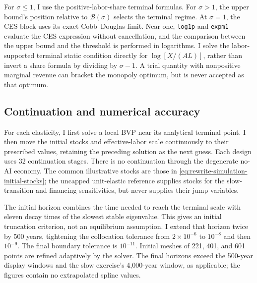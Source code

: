 For $\sigma\leq1$, I use the positive-labor-share terminal formulas.
For $\sigma>1$, the upper bound's position relative to $\mathcal B(\sigma)$ selects
the terminal regime. At $\sigma=1$, the CES block uses its exact
Cobb--Douglas limit. Near one, \texttt{log1p} and \texttt{expm1} evaluate
the CES expression without cancellation, and the comparison between the upper bound and the threshold is
performed in logarithms. I solve the labor-supported terminal static
condition directly for $\log[X/(AL)]$, rather than invert a share formula
by dividing by $\sigma-1$. A trial quantity with nonpositive marginal
revenue can bracket the monopoly optimum, but is never accepted as that
optimum.

\subsection{Continuation and numerical accuracy}

For each elasticity, I first solve a local BVP near its analytical terminal
point. I then move the initial stocks and effective-labor scale continuously
to their prescribed values, retaining the preceding solution as the
next guess. Each design uses 32 continuation stages. There is no
continuation through the degenerate no-AI economy. The common illustrative stocks are
those in \eqref{eq:rewrite-simulation-initial-stocks}; the uncapped unit-elastic
reference supplies stocks for the slow-transition and financing sensitivities,
but never supplies their jump variables.

The initial horizon combines the time needed to reach the terminal scale
with eleven decay times of the slowest stable eigenvalue. This gives an
initial truncation criterion, not an equilibrium assumption. I extend that
horizon twice by 500 years, tightening the collocation tolerance from
$2\times10^{-6}$ to $10^{-8}$ and then $10^{-9}$. The final boundary tolerance
is $10^{-11}$. Initial meshes of 221, 401, and 601 points are refined
adaptively by the solver. The final horizons exceed the 500-year display
windows and the slow exercise's 4,000-year window, as applicable; the figures
contain no extrapolated spline values.

